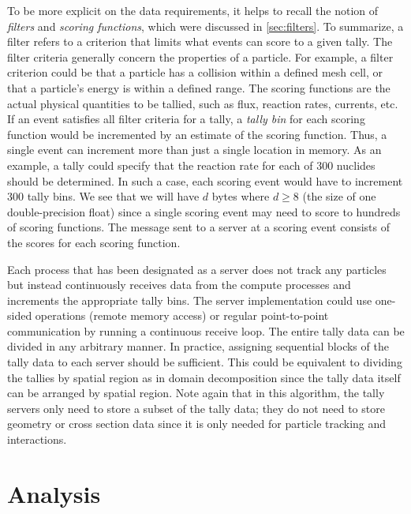 To be more explicit on the data requirements, it helps to recall the notion of
\emph{filters} and \emph{scoring functions}, which were discussed in
\autoref{sec:filters}. To summarize, a filter refers to a criterion that limits
what events can score to a given tally. The filter criteria generally concern
the properties of a particle. For example, a filter criterion could be that a
particle has a collision within a defined mesh cell, or that a particle's energy
is within a defined range. The scoring functions are the actual physical
quantities to be tallied, such as flux, reaction rates, currents, etc. If an
event satisfies all filter criteria for a tally, a \emph{tally bin} for each
scoring function would be incremented by an estimate of the scoring
function. Thus, a single event can increment more than just a single location in
memory. As an example, a tally could specify that the reaction rate for each of
300 nuclides should be determined. In such a case, each scoring event would have
to increment 300 tally bins. We see that we will have $d$ bytes where $d \ge 8$
(the size of one double-precision float) since a single scoring event may need
to score to hundreds of scoring functions. The message sent to a server at a
scoring event consists of the scores for each scoring function.

Each process that has been designated as a server does not track any particles
but instead continuously receives data from the compute processes and increments
the appropriate tally bins. The server implementation could use one-sided
operations (remote memory access) or regular point-to-point communication by
running a continuous receive loop. The entire tally data can be divided in any
arbitrary manner. In practice, assigning sequential blocks of the tally data to
each server should be sufficient. This could be equivalent to dividing the
tallies by spatial region as in domain decomposition since the tally data itself
can be arranged by spatial region. Note again that in this algorithm, the tally
servers only need to store a subset of the tally data; they do not need to store
geometry or cross section data since it is only needed for particle tracking and
interactions.

\section{Analysis}
\label{sec:tally-server-analysis}


